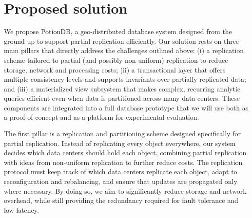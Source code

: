 %

\section{Proposed solution}

We propose PotionDB, a geo-distributed database system designed from the ground up to support partial replication efficiently. Our solution rests on three main pillars that directly address the challenges outlined above:
(i) a replication scheme tailored to partial (and possibly non-uniform) replication to reduce storage, network and processing costs;
(ii) a transactional layer that offers multiple consistency levels and supports invariants over partially replicated data; and
(iii) a materialized view subsystem that makes complex, recurring analytic queries efficient even when data is partitioned across many data centers.
These components are integrated into a full database prototype that we will use both as a proof-of-concept and as a platform for experimental evaluation.

The first pillar is a replication and partitioning scheme designed specifically for partial replication.
Instead of replicating every object everywhere, our system decides which data centers should hold each object, combining partial replication with ideas from non-uniform replication to further reduce costs.
The replication protocol must keep track of which data centers replicate each object, adapt to reconfiguration and rebalancing, and ensure that updates are propagated only where necessary.
By doing so, we aim to significantly reduce storage and network overhead, while still providing the redundancy required for fault tolerance and low latency.


